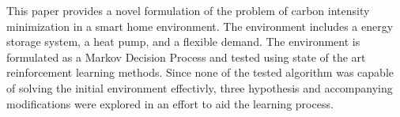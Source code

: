 This paper provides a novel formulation of the problem of carbon intensity minimization in a smart home environment. The environment includes a energy storage system, a heat pump, and a flexible demand. The environment is formulated as a Markov Decision Process and tested using state of the art reinforcement learning methods. Since none of the tested algorithm was capable of solving the initial environment effectivly, three hypothesis and accompanying modifications were explored in an effort to aid the learning process.